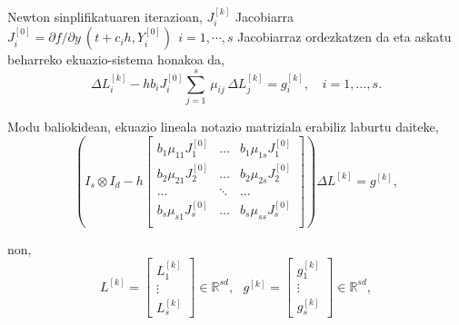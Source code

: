 Newton sinplifikatuaren iterazioan, $J_i^{[k]}$ Jacobiarra $J_i^{[0]}=\partial f / \partial y \ (t+c_ih, Y_i^{[0]}) \ \ i=1,\cdots,s$ Jacobiarraz ordezkatzen da eta askatu beharreko ekuazio-sistema honakoa da,
\begin{equation*}
\Delta L_{i}^{[k]}  - h b_i J_i^{[0]} \sum_{j=1}^{s}\, \mu_{ij} \, \Delta L_{j}^{[k]}=g_i^{[k]}, \quad  i=1 ,\ldots, s.
\end{equation*}

Modu baliokidean, ekuazio lineala notazio matriziala erabiliz laburtu daiteke,
\begin{equation*}
\left (I_s \otimes I_d - h  
\begin{bmatrix}
b_1 \mu_{11} J_1^{[0]} & \dots & b_1 \mu_{1s} J_1^{[0]} \\
b_2 \mu_{21} J_2^{[0]} & \dots & b_2 \mu_{2s} J_2^{[0]} \\
\dots          & \ddots & \dots \\
b_s \mu_{s1} J_s^{[0]} & \dots & b_s \mu_{ss} J_s^{[0]} \\ 
\end{bmatrix} \right) \Delta L^{[k]} =g^{[k]},
\end{equation*}

non,
\begin{equation*}
L^{[k]}=\begin{bmatrix}
L_1^{[k]} \\
\vdots \\
L_s^{[k]}
\end{bmatrix} \in \mathbb{R}^{sd}, \ \ \
g^{[k]}=\begin{bmatrix}
g_1^{[k]} \\
\vdots \\
g_s^{[k]}
\end{bmatrix} \in \mathbb{R}^{sd},  
\end{equation*}


